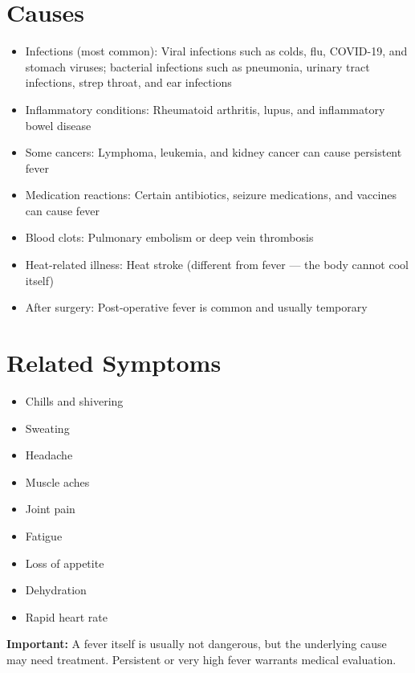 \section*{Causes}
\begin{itemize}
  \item Infections (most common): Viral infections such as colds, flu, COVID-19, and stomach viruses; bacterial infections such as pneumonia, urinary tract infections, strep throat, and ear infections
  \item Inflammatory conditions: Rheumatoid arthritis, lupus, and inflammatory bowel disease
  \item Some cancers: Lymphoma, leukemia, and kidney cancer can cause persistent fever
  \item Medication reactions: Certain antibiotics, seizure medications, and vaccines can cause fever
  \item Blood clots: Pulmonary embolism or deep vein thrombosis
  \item Heat-related illness: Heat stroke (different from fever — the body cannot cool itself)
  \item After surgery: Post-operative fever is common and usually temporary
\end{itemize}

\section*{Related Symptoms}
\begin{itemize}
  \item Chills and shivering
  \item Sweating
  \item Headache
  \item Muscle aches
  \item Joint pain
  \item Fatigue
  \item Loss of appetite
  \item Dehydration
  \item Rapid heart rate
\end{itemize}
\textbf{Important:} A fever itself is usually not dangerous, but the underlying cause may need treatment. Persistent or very high fever warrants medical evaluation.

